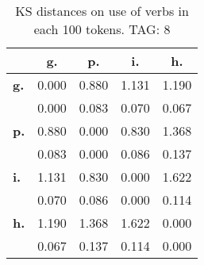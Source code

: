 \begin{table}[h!]
\begin{center}
\begin{tabular}{| l || c | c | c | c |}\hline
 & {\bf g.} & {\bf p.} & {\bf i.} & {\bf h.} \\\hline\hline
{\bf g.} & 0.000 & 0.880 & 1.131 & 1.190 \\
{\bf } & 0.000 & 0.083 & 0.070 & 0.067 \\\hline
{\bf p.} & 0.880 & 0.000 & 0.830 & 1.368 \\
{\bf } & 0.083 & 0.000 & 0.086 & 0.137 \\\hline
{\bf i.} & 1.131 & 0.830 & 0.000 & 1.622 \\
{\bf } & 0.070 & 0.086 & 0.000 & 0.114 \\\hline
{\bf h.} & 1.190 & 1.368 & 1.622 & 0.000 \\
{\bf } & 0.067 & 0.137 & 0.114 & 0.000 \\\hline
\end{tabular}
\caption{KS distances on use of verbs in each 100 tokens. TAG: 8}
\end{center}
\end{table}